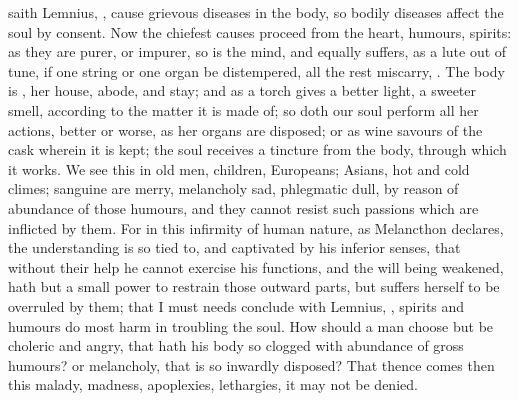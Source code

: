 {{saith Lemnius, , cause grievous diseases in the body, so bodily
diseases affect the soul by consent. Now the chiefest causes proceed
from the heart, humours, spirits: as they are purer, or impurer,
so is the mind, and equally suffers, as a lute out of tune, if one
string or one organ be distempered, all the rest miscarry, . The body is
, her house, abode, and stay; and as a torch gives a
better light, a sweeter smell, according to the matter it is made of;
so doth our soul perform all her actions, better or worse, as her
organs are disposed; or as wine savours of the cask wherein it is kept;
the soul receives a tincture from the body, through which it works. We
see this in old men, children, Europeans; Asians, hot and cold climes;
sanguine are merry, melancholy sad, phlegmatic dull, by reason of
abundance of those humours, and they cannot resist such passions which
are inflicted by them. For in this infirmity of human nature, as
Melancthon declares, the understanding is so tied to, and captivated by
his inferior senses, that without their help he cannot exercise his
functions, and the will being weakened, hath but a small power to
restrain those outward parts, but suffers herself to be overruled by
them; that I must needs conclude with Lemnius, , spirits and humours do most harm in
troubling the soul. How should a man choose but be choleric and
angry, that hath his body so clogged with abundance of gross humours?
or melancholy, that is so inwardly disposed? That thence comes then
this malady, madness, apoplexies, lethargies, \etc{} it may not be denied.

}}
